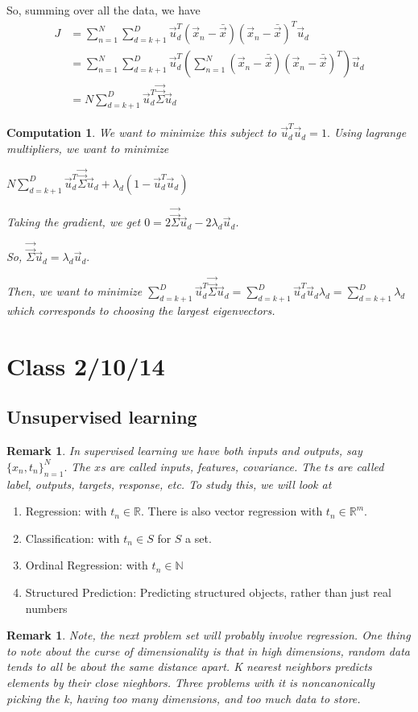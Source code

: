 \documentclass{amsart}
\newtheorem{comp}[subsubsection]{Computation}
\newtheorem{rem}[subsubsection]{Remark}
\begin{document}
So, summing over all the data, we have 
\begin{align*}
J & = \sum_{n=1}^N\sum_{d=k+1}^D \vec u_d^T (\vec x_n - \bar{\vec x})(\vec x_n - \bar{\vec x})^T \vec u_d
\\
&= \sum_{n=1}^N\sum_{d=k+1}^D \vec u_d^T \left(\sum_{n=1}^N(\vec x_n - \bar{\vec x})(\vec x_n - \bar{\vec x})^T\right) \vec u_d
\\
&= N \sum_{d=k+1}^D \vec u_d^T \vec{\vec{\Sigma}} \vec u_d
\end{align*}
\begin{comp}
We want to minimize this subject to $\vec u_d^T\vec u_d = 1.$ Using lagrange multipliers, we want to minimize

$ N \sum_{d=k+1}^D \vec u_d^T \vec{\vec{\Sigma}} \vec u_d + \lambda_d(1 - \vec u_d^T \vec u_d)$

Taking the gradient, we get $0=2 \vec{\vec{\Sigma}} \vec u_d - 2 \lambda_d \vec u_d$.

So, $\vec{\vec {\Sigma}} \vec u_d = \lambda_d \vec u_d.$

Then, we want to minimize $\sum_{d=k+1}^D \vec u_d^T \vec{\vec{\Sigma}}\vec u_d = \sum_{d=k+1}^D \vec u_d^T \vec u_d \lambda_d = \sum_{d=k+1}^D \lambda_d $
which corresponds to choosing the largest eigenvectors.
\end{comp}
\section{Class 2/10/14}
\subsection{Unsupervised learning}
\begin{rem}
In supervised learning we have both inputs and outputs, say $\{x_n,t_n\}_{n=1}^N.$ The $x$s are called inputs, features, covariance. The $t$s are called label, outputs, targets, response, etc. To study this, we will look at 
\end{rem}
\begin{enumerate}
\item Regression: with $t_n \in \mathbb R.$ There is also vector regression with $t_n \in \mathbb R^m$.
\item Classification: with $t_n \in S$ for $S$ a set.
\item Ordinal Regression: with $t_n \in \mathbb N$
\item Structured Prediction: Predicting structured objects, rather than just real numbers
\end{enumerate}
\begin{rem}
Note, the next problem set will probably involve regression. One thing to note about the curse of dimensionality is that in high dimensions, random data tends to all be about the same distance apart. K nearest neighbors predicts elements by their close nieghbors. Three problems with it is noncanonically picking the k, having too many dimensions, and too much data to store.
\end{rem}
\end{document}
